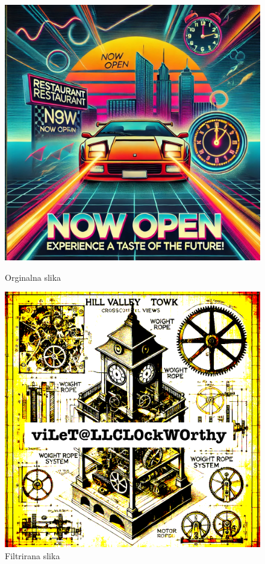 \documentclass{article}
\begin{document}
\begin{figure}[H]
    \centering
    \begin{minipage}{0.5\textwidth}
        \centering
        \includegraphics[width=\linewidth]{resto_trithemius.png}
        \caption{Orginalna slika}
        \label{fig:orginalna}
    \end{minipage}%
    \begin{minipage}{0.5\textwidth}
        \centering
        \includegraphics[width=\linewidth]{image_rgb_1.png}
        \caption{Filtrirana slika}
        \label{fig:filtrirana}
    \end{minipage}
\end{figure}
\end{document}
